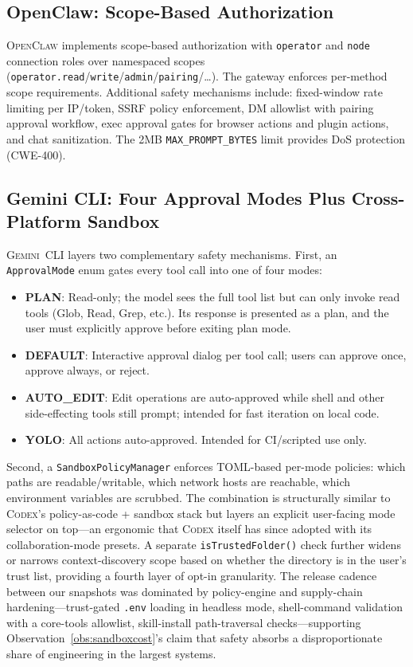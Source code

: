 \documentclass[11pt,a4paper]{article}
\newcommand{\cdx}{\textsc{Codex}\xspace}
\newcommand{\ocl}{\textsc{OpenClaw}\xspace}
\newcommand{\gemini}{\textsc{Gemini~CLI}\xspace}
\begin{document}
\subsection{OpenClaw: Scope-Based Authorization}

\ocl{} implements scope-based authorization with \texttt{operator} and \texttt{node} connection roles over namespaced scopes (\texttt{operator.read}/\texttt{write}/\texttt{admin}/\texttt{pairing}/\ldots).
The gateway enforces per-method scope requirements.
Additional safety mechanisms include: fixed-window rate limiting per IP/token, SSRF policy enforcement, DM allowlist with pairing approval workflow, exec approval gates for browser actions and plugin actions, and chat sanitization.
The 2MB \texttt{MAX\_PROMPT\_BYTES} limit provides DoS protection (CWE-400).

\subsection{Gemini CLI: Four Approval Modes Plus Cross-Platform Sandbox}

\gemini{} layers two complementary safety mechanisms.
First, an \texttt{ApprovalMode} enum gates every tool call into one of four modes:
\begin{itemize}[itemsep=1pt]
  \item \textbf{PLAN}: Read-only; the model sees the full tool list but can only invoke read tools (Glob, Read, Grep, etc.). Its response is presented as a plan, and the user must explicitly approve before exiting plan mode.
  \item \textbf{DEFAULT}: Interactive approval dialog per tool call; users can approve once, approve always, or reject.
  \item \textbf{AUTO\_EDIT}: Edit operations are auto-approved while shell and other side-effecting tools still prompt; intended for fast iteration on local code.
  \item \textbf{YOLO}: All actions auto-approved. Intended for CI/scripted use only.
\end{itemize}
Second, a \texttt{SandboxPolicyManager} enforces TOML-based per-mode policies: which paths are readable/writable, which network hosts are reachable, which environment variables are scrubbed.
The combination is structurally similar to \cdx{}'s policy-as-code + sandbox stack but layers an explicit user-facing mode selector on top---an ergonomic that \cdx{} itself has since adopted with its collaboration-mode presets.
A separate \texttt{isTrustedFolder()} check further widens or narrows context-discovery scope based on whether the directory is in the user's trust list, providing a fourth layer of opt-in granularity.
The release cadence between our snapshots was dominated by policy-engine and supply-chain hardening---trust-gated \texttt{.env} loading in headless mode, shell-command validation with a core-tools allowlist, skill-install path-traversal checks---supporting Observation~\ref{obs:sandboxcost}'s claim that safety absorbs a disproportionate share of engineering in the largest systems.
\end{document}
